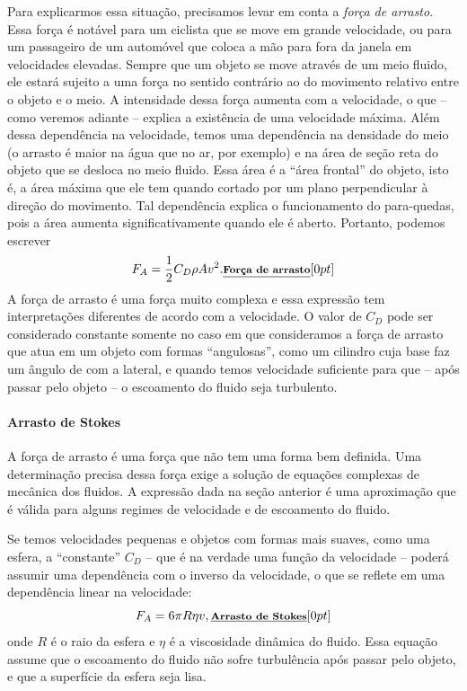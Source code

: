 Para explicarmos essa situação, precisamos levar em conta a \emph{força de arrasto}. Essa força é notável para um ciclista que se move em grande velocidade, ou para um passageiro de um automóvel que coloca a mão para fora da janela em velocidades elevadas. Sempre que um objeto se move através de um meio fluido, ele estará sujeito a uma força no sentido contrário ao do movimento relativo entre o objeto e o meio. A intensidade dessa força aumenta com a velocidade, o que -- como veremos adiante -- explica a existência de uma velocidade máxima. Além dessa dependência na velocidade, temos uma dependência na densidade do meio (o arrasto é maior na água que no ar, por exemplo) e na área de seção reta do objeto que se desloca no meio fluido. Essa área é a ``área frontal'' do objeto, isto é, a área máxima que ele tem quando cortado por um plano perpendicular à direção do movimento. Tal dependência explica o funcionamento do para-quedas, pois a área aumenta significativamente quando ele é aberto. Portanto, podemos escrever
\begin{equation}\label{Eq:ExpPadraoArrasto}
  F_A = \frac{1}{2}C_D \rho A v^2. \relax{\footnotesize\emph{\textbf{Força de arrasto}}}[0pt]
\end{equation}
%
 A força de arrasto é uma força muito complexa e essa expressão tem interpretações diferentes de acordo com a velocidade. O valor de $C_D$ pode ser considerado constante somente no caso em que consideramos a força de arrasto que atua em um objeto com formas ``angulosas'', como um cilindro cuja base faz um ângulo de  com a lateral, e quando temos velocidade suficiente para que -- após passar pelo objeto -- o escoamento do fluido seja turbulento. 

\paragraph{Arrasto de Stokes}

A força de arrasto é uma força que não tem uma forma bem definida. Uma determinação precisa dessa força exige a solução de equações complexas de mecânica dos fluidos. A expressão dada na seção anterior é uma aproximação que é válida para alguns regimes de velocidade e de escoamento do fluido.

Se temos velocidades pequenas e objetos com formas mais suaves,  como uma esfera, a ``constante'' $C_D$ -- que é na verdade uma função da velocidade -- poderá assumir uma dependência com o inverso da velocidade, o que se reflete em uma dependência linear na velocidade:
\begin{equation}
  F_A = 6 \pi R \eta v, \relax{\footnotesize\emph{\textbf{Arrasto de Stokes}}}[0pt]
\end{equation}
%
onde $R$ é o raio da esfera e $\eta$ é a viscosidade dinâmica do fluido. Essa equação assume que o escoamento do fluido não sofre turbulência após passar pelo objeto, e que a superfície da esfera seja lisa.


